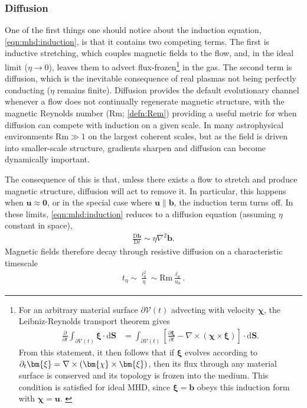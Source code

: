 \documentclass[12pt,twoside]{extreport}
\newcommand{\sbrac}[1]{\left[ #1 \right]} %
\newcommand{\mVector}[1]{\bm{#1}} %
\newcommand{\mdd}[1]{\mathrm{d} #1}
\newcommand{\mpp}[1]{\partial #1}
\newcommand{\mDD}[1]{\mathrm{D} #1}
\newcommand{\mppFrac}[2]{\frac{\mpp{#1}}{\mpp{#2}}}
\newcommand{\mDDFrac}[2]{\frac{\mDD{#1}}{\mDD{#2}}}
\newcommand{\mRem}{\ensuremath{\mathrm{Rm}}} %
\newcommand{\mSurface}{\ensuremath{\partial\mathcal{V}}} %
\begin{document}
\subsubsection{Diffusion}
\label{sec:evolve:decay}

One of the first things one should notice about the induction equation, \autoref{eqn:mhd:induction}, is that it contains two competing terms. The first is inductive stretching, which couples magnetic fields to the flow, and, in the ideal limit ($\eta \to 0$), leaves them to advect flux-frozen\footnote{
    For an arbitrary material surface $\mSurface(t)$ advecting with velocity $\mVector{\chi}$, the Leibniz-Reynolds transport theorem gives
    \begin{align}
    \mppFrac{}{t} \int_{\mSurface(t)} \mVector{\xi} \cdot\mdd\mVector{S}
        &= \int_{\mSurface(t)} \sbrac{
                \mppFrac{\mVector{\xi}}{t}
                - \nabla\times(\mVector{\chi}\times\mVector{\xi})
            }\cdot\mdd\mVector{S}
        .
    \end{align}
    From this statement, it then follows that if $\mVector{\xi}$ evolves according to $\mpp_t\mVector{\xi} = \nabla\times(\mVector{\chi}\times\mVector{\xi})$, then its flux through any material surface is conserved and its topology is frozen into the medium. This condition is satisfied for ideal MHD, since $\mVector{\xi} = \mVector{b}$ obeys this induction form with $\mVector{\chi} = \mVector{u}$.
    \label{fnote:frozen}
} in the gas. The second term is diffusion, which is the inevitable consequence of real plasmas not being perfectly conducting ($\eta$ remains finite). Diffusion provides the default evolutionary channel whenever a flow does not continually regenerate magnetic structure, with the magnetic Reynolds number ($\mRem$; \autoref{defn:Rem}) providing a useful metric for when diffusion can compete with induction on a given scale. In many astrophysical environments $\mRem \gg 1$ on the largest coherent scales, but as the field is driven into smaller-scale structure, gradients sharpen and diffusion can become dynamically important.

The consequence of this is that, unless there exists a flow to stretch and produce magnetic structure, diffusion will act to remove it. In particular, this happens when $\mVector{u} \approx \mVector{0}$, or in the special case where $\mVector{u}\parallel\mVector{b}$, the induction term turns off. In these limits, \autoref{eqn:mhd:induction} reduces to a diffusion equation (assuming $\eta$ constant in space),
\begin{align}
    \mDDFrac{\mVector{b}}{t}
        \sim \eta \nabla^2 \mVector{b}
    .
\end{align}
Magnetic fields therefore decay through resistive diffusion on a characteristic timescale
\begin{align}
    t_\eta
        \sim \frac{\ell_0^2}{\eta}
        \sim \mRem \frac{\ell_0}{u_0}
    .
\end{align}
\end{document}
